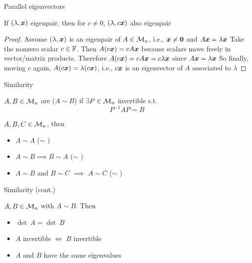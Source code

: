\documentclass[aspectratio=169]{beamer}\usepackage[]{graphicx}\usepackage[]{xcolor}
\begin{document}
\begin{frame}[importantcolour]{Parallel eigenvectors}
\begin{importanttheorem}
If $(\lambda,\bm{x})$ eigenpair, then for $c\neq 0$, $(\lambda,c\bm{x})$ also eigenpair
\end{importanttheorem}
\vfill
\begin{proof}
Assume $(\lambda,\bm{x})$ is an eigenpair of $A\in\mathcal{M}_n$, i.e., $\bx\neq\b0$ and $A\bm{x}=\lambda \bm{x}$
\vskip0.5cm
Take the nonzero scalar $c\in\mathbb{F}$.
Then $A(c\bm{x})=cA\bm{x}$ because scalars move freely in vector/matrix products.
Therefore $A(c\bm{x})=cA\bm{x}=c\lambda\bm{x}$ since $A\bm{x}=\lambda\bm{x}$
\vskip0.5cm
So finally, moving $c$ again, $A(c\bm{x})=\lambda(c\bm{x})$, i.e., $c\bm{x}$ is an eigenvector of $A$ associated to $\lambda$
\end{proof}
\end{frame}






\begin{frame}{Similarity}
\begin{importantdefinition}[Similarity]
$A,B\in\mathcal{M}_n$ are  ($A\sim B$) if $\exists P\in\mathcal{M}_n$ invertible s.t.
\[
P^{-1}AP=B
\]
\end{importantdefinition}
\vfill
\begin{theorem}
$A,B,C\in\mathcal{M}_n$, then
\begin{itemize}
	\item $A\sim A$ \hfill ($\sim$ )
	\item $A\sim B\implies B\sim A$ \hfill ($\sim$ )
	\item $A\sim B$ and $B\sim C$ $\implies$ $A\sim C$ \hfill ($\sim$ )
\end{itemize}
\end{theorem}
\end{frame}

\begin{frame}{Similarity (cont.)}
\begin{importanttheorem}
$A,B\in\mathcal{M}_n$ with $A\sim B$. Then
\begin{itemize}
	\item $\det\ A=\det\ B$
	\item $A$ invertible $\iff$ $B$ invertible
	\item $A$ and $B$ have the same eigenvalues
\end{itemize}
\end{importanttheorem}
\end{frame}
\end{document}
